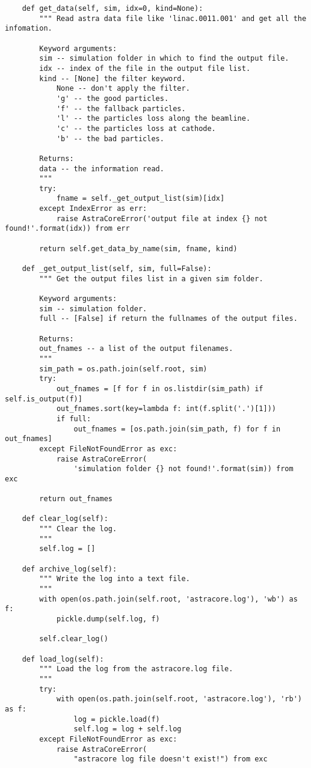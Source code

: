 \begin{footnotesize}
\begin{verbatim}
    def get_data(self, sim, idx=0, kind=None):
        """ Read astra data file like 'linac.0011.001' and get all the infomation.

        Keyword arguments:
        sim -- simulation folder in which to find the output file.
        idx -- index of the file in the output file list.
        kind -- [None] the filter keyword.
            None -- don't apply the filter.
            'g' -- the good particles.
            'f' -- the fallback particles.
            'l' -- the particles loss along the beamline.
            'c' -- the particles loss at cathode.
            'b' -- the bad particles.

        Returns:
        data -- the information read.
        """
        try:
            fname = self._get_output_list(sim)[idx]
        except IndexError as err:
            raise AstraCoreError('output file at index {} not found!'.format(idx)) from err

        return self.get_data_by_name(sim, fname, kind)

    def _get_output_list(self, sim, full=False):
        """ Get the output files list in a given sim folder.

        Keyword arguments:
        sim -- simulation folder.
        full -- [False] if return the fullnames of the output files.

        Returns:
        out_fnames -- a list of the output filenames.
        """
        sim_path = os.path.join(self.root, sim)
        try:
            out_fnames = [f for f in os.listdir(sim_path) if self.is_output(f)]
            out_fnames.sort(key=lambda f: int(f.split('.')[1]))
            if full:
                out_fnames = [os.path.join(sim_path, f) for f in out_fnames]
        except FileNotFoundError as exc:
            raise AstraCoreError(
                'simulation folder {} not found!'.format(sim)) from exc

        return out_fnames

    def clear_log(self):
        """ Clear the log.
        """
        self.log = []

    def archive_log(self):
        """ Write the log into a text file.
        """
        with open(os.path.join(self.root, 'astracore.log'), 'wb') as f:
            pickle.dump(self.log, f)

        self.clear_log()

    def load_log(self):
        """ Load the log from the astracore.log file.
        """
        try:
            with open(os.path.join(self.root, 'astracore.log'), 'rb') as f:
                log = pickle.load(f)
                self.log = log + self.log
        except FileNotFoundError as exc:
            raise AstraCoreError(
                "astracore log file doesn't exist!") from exc


\end{verbatim}
\end{footnotesize}
